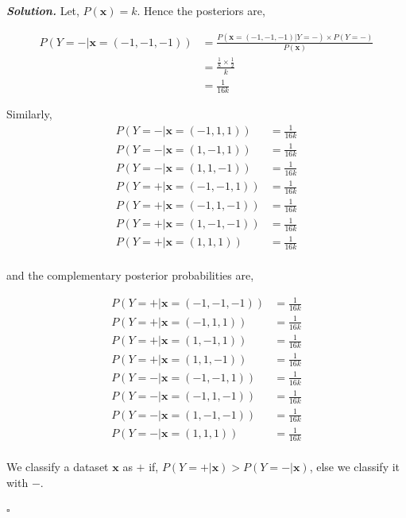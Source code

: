 \documentclass[8pt]{article}
\newenvironment{solution}[1][\it{Solution}]{\textbf{#1. } }{$\square$}
\begin{document}
\begin{solution}
Let, $P(\boldsymbol{x}) = k$. Hence the posteriors are,

$$
\begin{aligned}
    P(Y = - | \boldsymbol{x} = (-1, -1, -1)) &= \frac{P(\boldsymbol{x} = (-1, -1, -1) | Y = -) \times P(Y = -)}{P(\boldsymbol{x})}\\
    &= \frac{\frac{1}{8} \times \frac{1}{2}}{k}\\
    &= \frac{1}{16k}
\end{aligned}
$$

Similarly,
$$
\begin{aligned}
    P(Y = - | \boldsymbol{x} = (-1, 1, 1)) &= \frac{1}{16k}\\
    P(Y = - | \boldsymbol{x} = (1, -1, 1)) &= \frac{1}{16k}\\
    P(Y = - | \boldsymbol{x} = (1, 1, -1)) &= \frac{1}{16k}\\
    P(Y = + | \boldsymbol{x} = (-1, -1, 1)) &= \frac{1}{16k}\\
    P(Y = + | \boldsymbol{x} = (-1, 1, -1)) &= \frac{1}{16k}\\
    P(Y = + | \boldsymbol{x} = (1, -1, -1)) &= \frac{1}{16k}\\
    P(Y = + | \boldsymbol{x} = (1, 1, 1)) &= \frac{1}{16k}\\
\end{aligned}
$$

and the complementary posterior probabilities are,

$$
\begin{aligned}
    P(Y = + | \boldsymbol{x} = (-1, -1, -1)) &= \frac{1}{16k}\\
    P(Y = + | \boldsymbol{x} = (-1, 1, 1)) &= \frac{1}{16k}\\
    P(Y = + | \boldsymbol{x} = (1, -1, 1)) &= \frac{1}{16k}\\
    P(Y = + | \boldsymbol{x} = (1, 1, -1)) &= \frac{1}{16k}\\
    P(Y = - | \boldsymbol{x} = (-1, -1, 1)) &= \frac{1}{16k}\\
    P(Y = - | \boldsymbol{x} = (-1, 1, -1)) &= \frac{1}{16k}\\
    P(Y = - | \boldsymbol{x} = (1, -1, -1)) &= \frac{1}{16k}\\
    P(Y = - | \boldsymbol{x} = (1, 1, 1)) &= \frac{1}{16k}\\
\end{aligned}
$$

We classify a dataset $\boldsymbol{x}$ as $+$ if, $P(Y = + | \boldsymbol{x}) > P(Y = - | \boldsymbol{x})$, else we classify it with $-$.


\end{solution}
\end{document}
